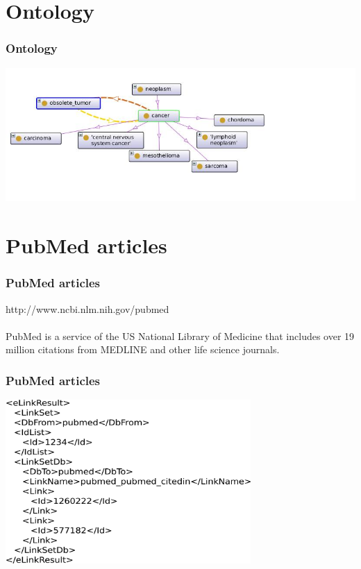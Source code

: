 \documentclass[utf8,handout]{beamer}
\begin{document}
\section{Ontology}
  \begin{frame}
    \frametitle{Ontology}  
\begin{flushleft}
	\includegraphics[width=1.4\textwidth]{./ontology}       
\end{flushleft}
  \end{frame}


\section{PubMed articles}
  \begin{frame}
    \frametitle{PubMed articles} 
    http://www.ncbi.nlm.nih.gov/pubmed  \\
    \ \\
	PubMed is a service of the US National Library of Medicine that includes over 19 million citations from MEDLINE and other life science journals.\\

  \end{frame}

  \begin{frame}
    \frametitle{PubMed articles} 
		\includegraphics[width=0.7\textwidth]{./pubMed}       	
  \end{frame}
\end{document}
